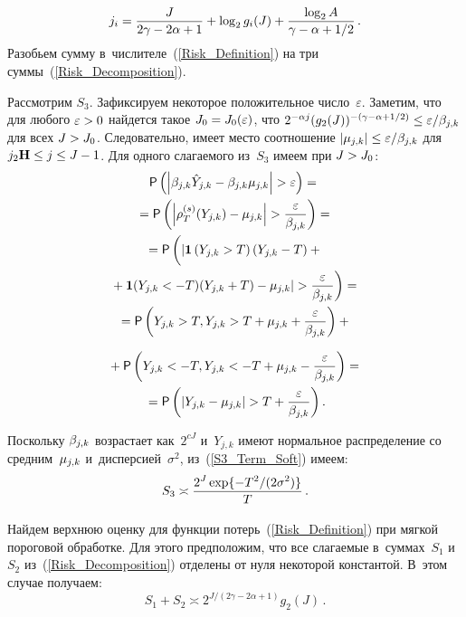 \begin{multicols}{2}
\vspace*{2pt}

\noindent
$$
j_i=\displaystyle\frac{\displaystyle J\mathstrut}{\displaystyle 2\gamma-2\alpha+1\mathstrut}+\log_2 g_i(J)+ \displaystyle\frac{\displaystyle \log_2 A\mathstrut}{\displaystyle \gamma-\alpha+1/2\mathstrut}\,.
$$
Разобьем сумму в~чис\-ли\-те\-ле~(\ref{Risk_Definition}) на три суммы~(\ref{Risk_Decomposition}).

Рассмотрим $S_3$. Зафиксируем некоторое положительное чис\-ло~$\varepsilon$.
 Заметим, что для любого $\varepsilon\hm>0$ найдется такое $J_0\hm=J_0(\varepsilon)$, 
 что $ 2^{-\alpha j}(g_2(J))^{-(\gamma-\alpha+1/2)}\hm\leq\varepsilon/\betajk$ 
 для всех $J\hm>J_0$. Следовательно, имеет мес\-то соотношение
$|\mujk|\hm\leq\varepsilon/\betajk$ для $j_2\h\leq j\hm\leq J-1$. 
Для одного сла\-га\-емо\-го из~$S_3$ имеем при $J\hm>J_0$:
\begin{multline*}
{\sf P}\left(\left|\betajk\hat{Y}_{j,k}-\betajk\mujk\right|>\varepsilon\right)={}\\
{}=
{\sf P}\left(\left|\rho_{T}^{(s)}(Y_{j,k})-\mujk\right|>\fr{\varepsilon}{\betajk}\right)={}\\
{}={\sf P}\left(
\vphantom{\fr{\varepsilon}{\betajk}}
|\mathbf{1}\left(Y_{j,k}>T\right)(Y_{j,k}-T)+{}\right.\\
\left.{}+
\mathbf{1}(Y_{j,k}<-T)(Y_{j,k}+T)-\mujk|>\fr{\varepsilon}{\betajk}\right)={}\\
{}={\sf P}\left(Y_{j,k}>T,Y_{j,k}>T+\mujk+\fr{\varepsilon}{\betajk}\right)+{}
\end{multline*}

\noindent
\begin{multline}
{}+
{\sf P}\left(Y_{j,k}<-T,Y_{j,k}<-T+\mujk-\fr{\varepsilon}{\betajk}\right)={}\\
{}={\sf P}\left(|Y_{j,k}-\mujk|>T+\fr{\varepsilon}{\betajk}\right).
\label{S3_Term_Soft}
\end{multline}

Поскольку $\beta_{j,k}$ воз\-рас\-та\-ет как~$2^{cJ}$ и~$Y_{j,k}$ 
имеют нормальное распределение со сред\-ним~$\mu_{j,k}$ и~дис\-пер\-си\-ей~$\sigma^2$, 
из~(\ref{S3_Term_Soft}) имеем:
\begin{equation}
S_3\asymp \displaystyle\frac{\displaystyle 2^J\exp\{-T^2/(2\sigma^2)\}\mathstrut}{\displaystyle T\mathstrut}\,.
\label{S3_Order_Soft}
\end{equation}

Найдем верх\-нюю оценку для функции потерь~(\ref{Risk_Definition}) при мягкой 
пороговой обработке. Для этого предположим, что все сла\-га\-емые в~суммах~$S_1$ и~$S_2$ 
из~(\ref{Risk_Decomposition}) отделены от нуля некоторой константой. 
В~этом случае получаем:
\begin{equation}
S_1+S_2\asymp2^{{J}/({2\gamma-2\alpha+1})}g_2(J)\,.
\label{S1S2_Order_Soft}
\end{equation}


\end{multicols}
